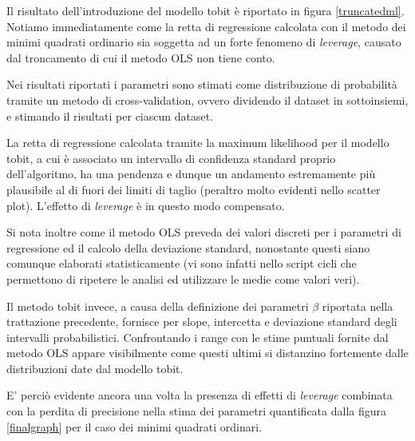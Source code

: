 \documentclass[12pt,openright,twoside,a4paper]{book}
\begin{document}
Il risultato dell'introduzione del modello tobit è riportato in figura \ref{truncatedml}.
Notiamo immediatamente come la retta di regressione calcolata con il metodo dei minimi quadrati ordinario sia soggetta ad un forte fenomeno di \textit{leverage}, causato dal troncamento di cui il metodo OLS non tiene conto.

Nei risultati riportati i parametri sono stimati come distribuzione di probabilità tramite un metodo di cross-validation, ovvero dividendo il dataset in sottoinsiemi, e stimando il risultati per ciascun dataset.

La retta di regressione calcolata tramite la maximum likelihood per il modello tobit, a cui è associato un intervallo di confidenza standard proprio dell'algoritmo, ha una pendenza e dunque un andamento estremamente più plausibile al di fuori dei limiti di taglio (peraltro molto evidenti nello scatter plot).
L'effetto di \textit{leverage} è in questo modo compensato.

Si nota inoltre come il metodo OLS preveda dei valori discreti per i parametri di regressione ed il calcolo della deviazione standard, nonostante questi siano comunque elaborati statisticamente (vi sono infatti nello script cicli che permettono di ripetere le analisi ed utilizzare le medie come valori veri).

Il metodo tobit invece, a causa della definizione dei parametri $\beta$ riportata nella trattazione precedente, fornisce per slope, intercetta e deviazione standard degli intervalli probabilistici.
Confrontando i range con le stime puntuali fornite dal metodo OLS appare visibilmente come questi ultimi si distanzino fortemente dalle distribuzioni date dal modello tobit.

E' perciò evidente ancora una volta la presenza di effetti di \textit{leverage} combinata con la perdita di precisione nella stima dei parametri quantificata dalla figura \ref{finalgraph} per il caso dei minimi quadrati ordinari.
\end{document}
